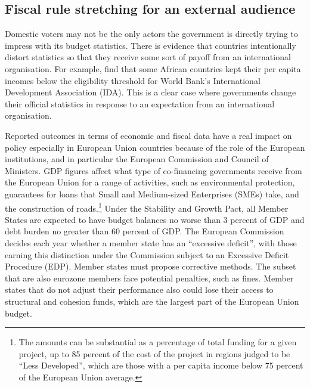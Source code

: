 \documentclass[]{article}
\begin{document}

\subsection{Fiscal rule stretching for an external audience}

Domestic voters may not be the only actors the government is directly trying to impress with its budget statistics. There is evidence that countries intentionally distort statistics so that they receive some sort of payoff from an international organisation. For example, \cite{kerner2016} find that some African countries kept their per capita incomes below the eligibility threshold for World Bank’s International Development Association (IDA). This is a clear case where governments change their official statistics in response to an expectation from an international organisation.

Reported outcomes in terms of economic and fiscal data have a real impact on policy especially in European Union countries because of the role of the European institutions, and in particular the European Commission and Council of Ministers. GDP figures affect what type of co-financing governments receive from the European Union for a range of activities, such as environmental protection, guarantees for loans that Small and Medium-sized Enterprises (SMEs) take, and the construction of roads.\footnote{The amounts can be substantial as a percentage of total funding for a given project, up to 85 percent of the cost of the project in regions judged to be “Less Developed”, which are those with a per capita income below 75 percent of the European Union average.} Under the Stability and Growth Pact, all Member States are expected to have budget balances no worse than 3 percent of GDP and debt burden no greater than 60 percent of GDP. The European Commission decides each year whether a member state has an ``excessive deficit'', with those earning this distinction under the Commission subject to an Excessive Deficit Procedure (EDP). Member states must propose corrective methods. The subset that are also eurozone members face potential penalties, such as fines. Member states that do not adjust their performance also could lose their access to structural and cohesion funds, which are the largest part of the European Union budget.
\end{document}
